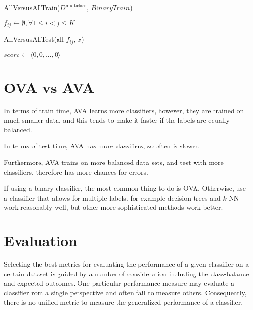 \begin{algorithm}
    \caption{AllVersusAllTrain($D^\text{multiclass}$, $BinaryTrain$)}
    \label{alg:avatrain}
	$f_{ij} \gets \emptyset, \forall 1 \leq i < j \leq K$\;
    \end{algorithm}

	\begin{algorithm}
		\caption{AllVersusAllTest(all $f_{ij}$, $x$)}
		\label{alg:avatest}
		$score \gets \langle 0, 0, ..., 0 \rangle$\;
		\end{algorithm}

\section{OVA vs AVA}
In terms of train time, AVA learns more classifiers, however, they are trained on much smaller data, and this tends to make it faster if the labels are equally balanced.

In terms of test time, AVA has more classifiers, so often is slower.

Furthermore, AVA trains on more balanced data sets, and test with more classifiers, therefore has more chances for errors.

If using a binary classifier, the most common thing to do is OVA. Otherwise, use a classifier that allows for multiple labels, for example decision trees and \(k\)-NN work reasonably well, but other more sophisticated methods work better.

\section{Evaluation}

Selecting the best metrics for evaluating the performance of a given classifier on a certain dataset is guided by a number of consideration including the class-balance and expected outcomes. One particular performance measure may evaluate a classifier rom a single perspective and often fail to measure others. Consequently, there is no unified metric to measure the generalized performance of a classifier.

